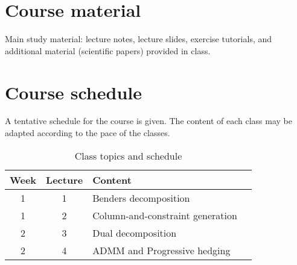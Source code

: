 \documentclass[a4paper]{artikel3}
\begin{document}
\vspace{-18pt}
\section{Course material}

Main study material: lecture notes, lecture slides, exercise tutorials, and additional material (scientific papers) provided in class.

\section{Course schedule}

A tentative schedule for the course is given. The content of each class may be adapted according to the pace of the classes. 

\begin{table}[h]
\centering
\begin{tabular}{ccll} \hline
	 Week  & Lecture & Content                          \\ \hline
	 1    & 1  & Benders decomposition                  \\
	 1    & 2  & Column-and-constraint generation       \\
	 2    & 3  & Dual decomposition                     \\
	 2    & 4  & ADMM and Progressive hedging           \\ \hline
\end{tabular}
\caption{Class topics and schedule}
\end{table}
\end{document}
